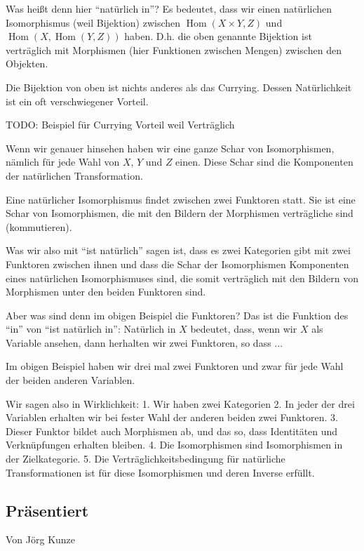 \documentclass[a4paper]{amsart}
\theoremstyle{definition}
\DeclareMathOperator{\Hom}{Hom}
\begin{document}
Was heißt denn hier "`natürlich in"'? Es bedeutet, dass wir einen natürlichen Isomorphismus (weil Bijektion) zwischen $\Hom( X \times Y, Z )$ und $\Hom( X, \Hom( Y, Z ))$ haben. D.h. die oben genannte Bijektion ist verträglich mit Morphismen (hier Funktionen zwischen Mengen) zwischen den Objekten.

Die Bijektion von oben ist nichts anderes als das Currying. Dessen Natürlichkeit ist ein oft verschwiegener Vorteil.

TODO: Beispiel für Currying Vorteil weil Verträglich

Wenn wir genauer hinsehen haben wir eine ganze Schar von Isomorphismen, nämlich für jede Wahl von $X$, $Y$ und $Z$ einen. Diese Schar sind die Komponenten der natürlichen Transformation.

Eine natürlicher Isomorphismus findet zwischen zwei Funktoren statt. Sie ist eine Schar von Isomorphismen, die mit den Bildern der Morphismen verträgliche sind (kommutieren).

Was wir also mit "`ist natürlich"' sagen ist, dass es zwei Kategorien gibt mit zwei Funktoren zwischen ihnen und dass die Schar der Isomorphismen Komponenten eines natürlichen Isomorphismuses sind, die somit verträglich mit den Bildern von Morphismen unter den beiden Funktoren sind.

Aber was sind denn im obigen Beispiel die Funktoren? Das ist die Funktion des "`in"' von "`ist natürlich in"': Natürlich in $X$ bedeutet, dass, wenn wir $X$ als Variable ansehen, dann herhalten wir zwei Funktoren, so dass ...

Im obigen Beispiel haben wir drei mal zwei Funktoren und zwar für jede Wahl der beiden anderen Variablen.

Wir sagen also in Wirklichkeit:
1. Wir haben zwei Kategorien
2. In jeder der drei Variablen erhalten wir bei fester Wahl der anderen beiden zwei Funktoren.
3. Dieser Funktor bildet auch Morphismen ab, und das so, dass Identitäten und Verknüpfungen erhalten bleiben.
4. Die Isomorphismen sind Isomorphismen in der Zielkategorie.
5. Die Verträglichkeitsbedingung für natürliche Transformationen ist für diese Isomorphismen und deren Inverse erfüllt.

\subsection*{Präsentiert}
Von Jörg Kunze
\end{document}

